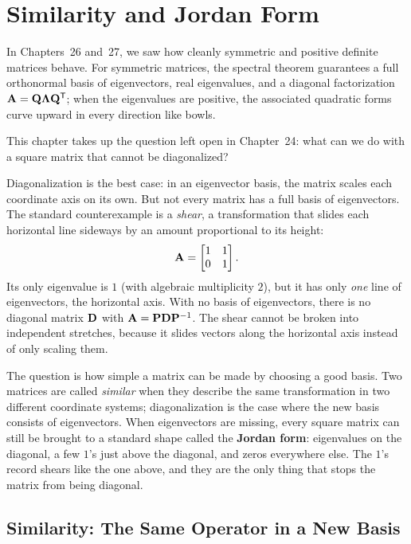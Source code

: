 \chapter{Similarity and Jordan Form}

In Chapters~26 and~27, we saw how cleanly symmetric and positive definite matrices behave. For symmetric matrices, the spectral theorem guarantees a full orthonormal basis of eigenvectors, real eigenvalues, and a diagonal factorization $\mathbf{A} = \mathbf{Q}\mathbf{\Lambda}\mathbf{Q}^{\mathsf{T}}$; when the eigenvalues are positive, the associated quadratic forms curve upward in every direction like bowls.

This chapter takes up the question left open in Chapter~24: what can we do with a square matrix that cannot be diagonalized?

Diagonalization is the best case: in an eigenvector basis, the matrix scales each coordinate axis on its own. But not every matrix has a full basis of eigenvectors. The standard counterexample is a \emph{shear}, a transformation that slides each horizontal line sideways by an amount proportional to its height:
\[
\mathbf{A} = \begin{bmatrix} 1 & 1 \\ 0 & 1 \end{bmatrix}.
\]
Its only eigenvalue is $1$ (with algebraic multiplicity $2$), but it has only \emph{one} line of eigenvectors, the horizontal axis. With no basis of eigenvectors, there is no diagonal matrix $\mathbf{D}$ with $\mathbf{A}=\mathbf{P}\mathbf{D}\mathbf{P}^{-1}$. The shear cannot be broken into independent stretches, because it slides vectors along the horizontal axis instead of only scaling them.

The question is how simple a matrix can be made by choosing a good basis. Two matrices are called \emph{similar} when they describe the same transformation in two different coordinate systems; diagonalization is the case where the new basis consists of eigenvectors. When eigenvectors are missing, every square matrix can still be brought to a standard shape called the \textbf{Jordan form}: eigenvalues on the diagonal, a few $1$'s just above the diagonal, and zeros everywhere else. The $1$'s record shears like the one above, and they are the only thing that stops the matrix from being diagonal.

\section{Similarity: The Same Operator in a New Basis}
\label{ch28:similarity}

